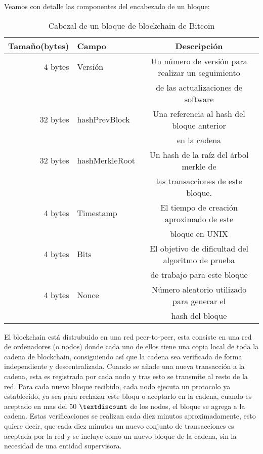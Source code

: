 \documentclass[11pt]{article} %
\begin{document}
Veamos con detalle las componentes del encabezado de un bloque:

\begin{table}[h!]
	\begin{center}
		\begin{tabular}{| r | l | c |}
		\hline	\textbf{Tamaño(bytes)} & \textbf{Campo} & \textbf{Descripción} \\ \hline
			4 bytes & Versión & Un número de versión para realizar un seguimiento
			\\ & & de las actualizaciones de software \\ \hline
			32 bytes & hashPrevBlock & Una referencia al hash del bloque anterior 
			\\ & & en la cadena \\ \hline
			32 bytes & hashMerkleRoot & Un hash de la raíz del árbol merkle \cite{merkle} de
			\\ & & las transacciones de este bloque. \\  \hline
			4 bytes & Timestamp & El tiempo de creación aproximado de este 
			\\ & & bloque en UNIX \\ \hline
			4 bytes & Bits & El objetivo de dificultad del algoritmo de prueba 
			\\ & & de trabajo para este bloque \\ \hline
			4 bytes & Nonce & Número aleatorio utilizado para generar el 
			\\ & & hash del bloque \\ 
			\hline
		\end{tabular}
		\caption{Cabezal de un bloque de blockchain de Bitcoin}
		\label{tab:cabezal}
	\end{center}
\end{table}

El blockchain está distrubuido en una red peer-to-peer, esta consiste en una red de ordenadores (o nodos) donde cada uno de ellos tiene una copia local de toda la cadena de blockchain, consiguiendo así que la cadena sea verificada de forma independiente y descentralizada. Cuando se añade una nueva transacción a la cadena, esta es registrada por cada nodo y tras esto se transmite al resto de la red. Para cada nuevo bloque recibido, cada nodo ejecuta un protocolo ya establecido, ya sea para rechazar este bloqu o aceptarlo en la cadena, cuando es aceptado en mas del 50 $\textdiscount$ de los nodos, el bloque se agrega a la cadena. Estas verificaciones se realizan cada diez minutos aproximadamente, esto quiere decir, que cada diez minutos un nuevo conjunto de transacciones es aceptada por la red y se incluye como un nuevo bloque de la cadena, sin la necesidad de una entidad supervisora.
\end{document}
